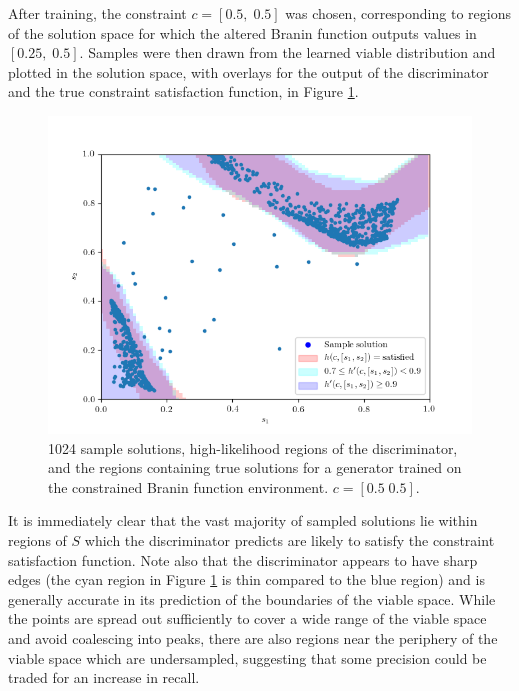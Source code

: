 \documentclass[../../main.tex]{subfiles}
\begin{document}
After training, the constraint $c=[0.5,\;0.5]$ was chosen, corresponding to regions of the solution space for which the altered Branin function outputs values in $[0.25,\;0.5]$.
Samples were then drawn from the learned viable distribution and plotted in the solution space, with overlays for the output of the discriminator and the true constraint satisfaction function, in Figure \ref{fig:equality05}.
\begin{figure}[H]
    \begin{center}
    \includegraphics[width=\textwidth]{equality05}
    \caption{
        1024 sample solutions, high-likelihood regions of the discriminator, and the regions containing true solutions for a generator trained on the constrained Branin function environment.
        $c=[0.5\;0.5]$.
    }
    \label{fig:equality05}
    \end{center}
\end{figure}
It is immediately clear that the vast majority of sampled solutions lie within regions of $S$ which the discriminator predicts are likely to satisfy the constraint satisfaction function.
Note also that the discriminator appears to have sharp edges (the cyan region in Figure \ref{fig:equality05} is thin compared to the blue region) and is generally accurate in its prediction of the boundaries of the viable space.
While the points are spread out sufficiently to cover a wide range of the viable space and avoid coalescing into peaks, there are also regions near the periphery of the viable space which are undersampled, suggesting that some precision could be traded for an increase in recall.
\end{document}

